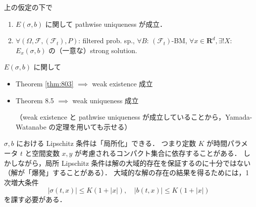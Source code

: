 \documentclass{jsarticle}
\begin{document}
\bigskip

\setcounter{thm}{2}

\begin{screen}
    \begin{thm}\label{thm:803}
        上の仮定の下で
        \begin{enumerate}[label=(\roman*)]
            \item
            $E(\sigma, b)$ に関して pathwise uniqueness が成立．
            \item
            $\forall (\Omega, \mathcal{F}, (\mathcal{F}_t), P)$: filtered prob. sp., $\forall B$: $(\mathcal{F}_t)$-BM, $\forall x\in\mathbf{R}^d, \exists! X$: $E_x(\sigma, b)$ の（一意な）strong solution.
        \end{enumerate}
    \end{thm}
\end{screen}

$E(\sigma, b)$ に関して 
\begin{itemize}
    \item 
    Theorem \ref{thm:803}
    $\implies $ weak existence 成立
    \item
    Theorem 8.5
    $\implies $ weak uniqueness 成立
    
    （weak existence と pathwise uniqueness が成立していることから，Yamada-Watanabe の定理を用いても示せる）
\end{itemize}

\begin{remark*}
    $\sigma, b$ における Lipschitz 条件は「局所化」できる．
    つまり定数 $K$ が時間パラメータ $t$ と空間変数 $x, y$ が考慮されるコンパクト集合に依存することがある．
    しかしながら，局所 Lipschitz 条件は解の大域的存在を保証するのに十分ではない（解が「爆発」することがある）．
    大域的な解の存在の結果を得るためには，1 次増大条件
    $$
    \left\lvert \sigma(t, x)\right\rvert\le K(1+\left\lvert x\right\rvert), \quad
    \left\lvert b(t, x)\right\rvert\le K(1+\left\lvert x\right\rvert)
    $$
    を課す必要がある．
\end{remark*}
\end{document}
